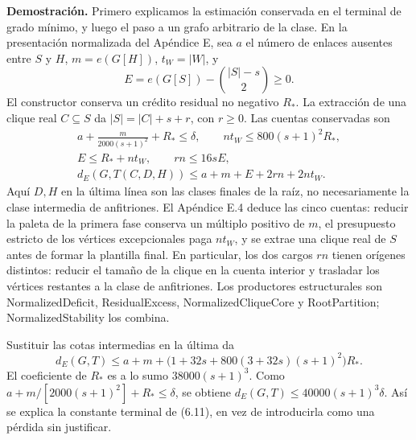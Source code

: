 \documentclass[spanish,11pt,a4paper]{article}
\begin{document}
\textbf{Demostración.} Primero explicamos la estimación conservada en el terminal de grado mínimo, y luego el paso a un grafo arbitrario de la clase. En la presentación normalizada del Apéndice E, sea \(a\) el número de enlaces ausentes entre \(S\) y \(H\), \(m=e(G[H])\), \(t_W=|W|\), y \[
E=e(G[S])-\binom{|S|-s}{2}\ge0.
\] El constructor conserva un crédito residual no negativo \(R_*\). La extracción de una clique real \(C\subseteq S\) da \(|S|=|C|+s+r\), con \(r\ge0\). Las cuentas conservadas son \[
\begin{gathered}
a+\frac{m}{2000(s+1)^2}+R_*\le\delta,\qquad
nt_W\le800(s+1)^2R_*,\\
E\le R_*+nt_W,\qquad rn\le16sE,\\
d_E(G,T(C,D,H))\le a+m+E+2rn+2nt_W.
\end{gathered}
\tag{6.14}
\] Aquí \(D,H\) en la última línea son las clases finales de la raíz, no necesariamente la clase intermedia de anfitriones. El Apéndice E.4 deduce las cinco cuentas: reducir la paleta de la primera fase conserva un múltiplo positivo de \(m\), el presupuesto estricto de los vértices excepcionales paga \(nt_W\), y se extrae una clique real de \(S\) antes de formar la plantilla final. En particular, los dos cargos \(rn\) tienen orígenes distintos: reducir el tamaño de la clique en la cuenta interior y trasladar los vértices restantes a la clase de anfitriones. Los productores estructurales son {\ttfamily\small NormalizedDe\discretionary{\hbox{\ensuremath{\hookrightarrow}}}{}{}ficit}, {\ttfamily\small ResidualExce\discretionary{\hbox{\ensuremath{\hookrightarrow}}}{}{}ss}, {\ttfamily\small NormalizedCl\discretionary{\hbox{\ensuremath{\hookrightarrow}}}{}{}iqueCore} y {\ttfamily\small RootPartitio\discretionary{\hbox{\ensuremath{\hookrightarrow}}}{}{}n}; {\ttfamily\small NormalizedSt\discretionary{\hbox{\ensuremath{\hookrightarrow}}}{}{}ability} los combina.

Sustituir las cotas intermedias en la última da \[
d_E(G,T)\le a+m+
\bigl(1+32s+800(3+32s)(s+1)^2\bigr)R_*.
\] El coeficiente de \(R_*\) es a lo sumo \(38000(s+1)^3\). Como \(a+m/[2000(s+1)^2]+R_*\le\delta\), se obtiene \(d_E(G,T)\le40000(s+1)^3\delta\). Así se explica la constante terminal de (6.11), en vez de introducirla como una pérdida sin justificar.
\end{document}
